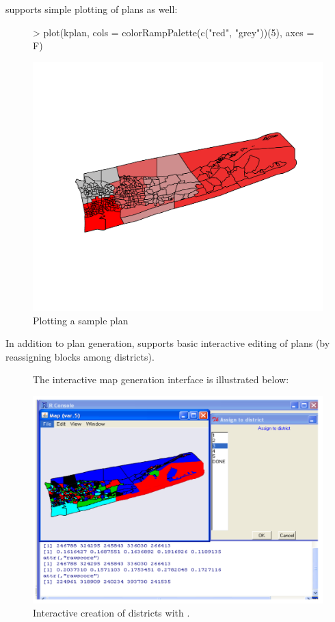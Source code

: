 \documentclass[article]{JSSstyle/jss}
\begin{document}
 supports simple plotting of plans as well:

  \begin{figure}[!h]
\begin{Schunk}
\begin{Sinput}
> plot(kplan, cols = colorRampPalette(c("red", "grey"))(5), axes = F)
\end{Sinput}
\end{Schunk}
\includegraphics{bardJSS-plot1a}
  \caption{\label{fig:rplot1} Plotting a sample plan}
  \end{figure}

\newpage
In addition to plan generation,   supports basic interactive editing of plans (by reassigning blocks among districts).

\begin{figure}[!h]
  The interactive map generation interface is illustrated below:
  \begin{center}
    \includegraphics[page=1]{edit_map.pdf}
  \end{center}

  \caption{\small Interactive creation of districts with .}
  \label{fig:edit}
\end{figure}
\newpage
\end{document}
